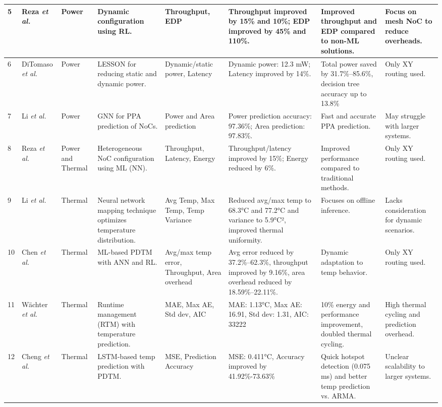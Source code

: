 \documentclass[conference]{IEEEtran}
\begin{document}
\begin{table*}[ht]
{\begin{tabularx}{\textwidth}{|p{0.5cm}|p{1.35cm}|p{0.8cm}|X|X|X|X|X|}
\hline
5 & Reza \textit{et al.}\cite{5} & Power & Dynamic configuration using RL. & Throughput, EDP & Throughput improved by 15\% and 10\%; EDP improved by 45\% and 110\%. & Improved throughput and EDP compared to non-ML solutions. & Focus on mesh NoC to reduce overheads. \\ 
\hline
6 & DiTomaso \textit{et al.}\cite{6} & Power & LESSON for reducing static and dynamic power. & Dynamic/static power, Latency & Dynamic power: 12.3 mW; Latency improved by 14\%. & Total power saved by 31.7\%–85.6\%, decision tree accuracy up to 13.8\% & Only XY routing used. \\ 
\hline
7 & Li \textit{et al.}\cite{7} & Power & GNN for PPA prediction of NoCs. & Power and Area prediction & Power prediction accuracy: 97.36\%; Area prediction: 97.83\%. & Fast and accurate PPA prediction. & May struggle with larger systems. \\ 
\hline
8 & Reza \textit{et al.}\cite{8} & Power and Thermal & Heterogeneous NoC configuration using ML (NN). & Throughput, Latency, Energy & Throughput/latency improved by 15\%; Energy reduced by 6\%. & Improved performance compared to traditional methods. & Only XY routing used. \\ 
\hline
9 & Li \textit{et al.}\cite{9} & Thermal & Neural network mapping technique optimizes temperature distribution. & Avg Temp, Max Temp, Temp Variance & Reduced avg/max temp to 68.3°C and 77.2°C and variance to 5.9°C², improved thermal uniformity. & Focuses on offline inference. & Lacks consideration for dynamic scenarios. \\ 
\hline
10 & Chen \textit{et al.}\cite{10} & Thermal & ML-based PDTM with ANN and RL. & Avg/max temp error, Throughput, Area overhead & Avg error reduced by 37.2\%–62.3\%, throughput improved by 9.16\%, area overhead reduced by 18.59\%–22.11\%. & Dynamic adaptation to temp behavior. & Only XY routing used. \\ 
\hline
11 & Wächter \textit{et al.}\cite{11} & Thermal & Runtime management (RTM) with temperature prediction. & MAE, Max AE, Std dev, AIC & MAE: 1.13°C, Max AE: 16.91, Std dev: 1.31, AIC: 33222 & 10\% energy and performance improvement, doubled thermal cycling. & High thermal cycling and prediction overhead. \\ 
\hline
12 & Cheng \textit{et al.}\cite{12} & Thermal & LSTM-based temp prediction with PDTM. & MSE, Prediction Accuracy & MSE: 0.411°C, Accuracy improved by 41.92\%-73.63\% & Quick hotspot detection (0.075 ms) and better temp prediction vs. ARMA. & Unclear scalability to larger systems. \\ 
\hline
\end{tabularx}
}
\end{table*}
\end{document}
